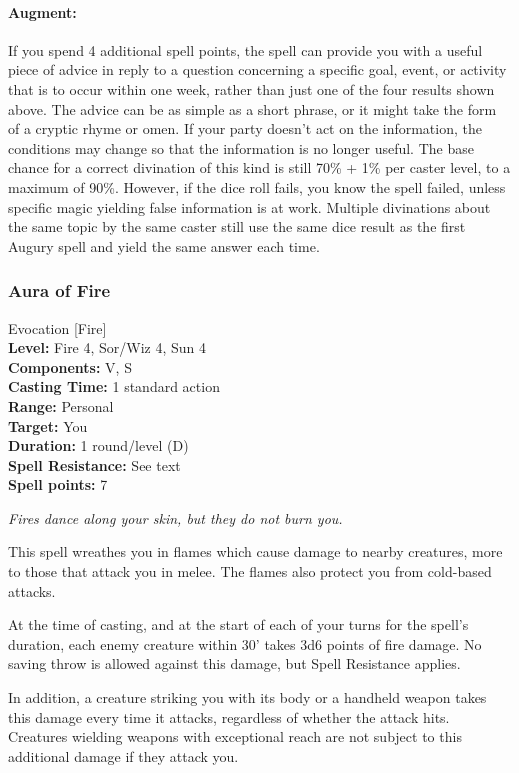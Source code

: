 \paragraph{Augment:} If you spend 4 additional spell points, the spell can provide you with a useful piece of advice in reply to a question concerning a specific goal, event, or activity that is to occur within one week, rather than just one of the four results shown above. 
The advice can be as simple as a short phrase, or it might take the form of a cryptic rhyme or omen. 
If your party doesn't act on the information, the conditions may change so that the information is no longer useful. 
The base chance for a correct divination of this kind is still 70\% + 1\% per caster level, to a maximum of 90\%. 
However, if the dice roll fails, you know the spell failed, unless specific magic yielding false information is at work.
Multiple divinations about the same topic by the same caster still use the same dice result as the first Augury spell and yield the same answer each time.
\subsubsection{Aura of Fire}
\label{Spell:AuraOfFire}
Evocation [Fire]
\\ \textbf{Level:} Fire 4, Sor/Wiz 4, Sun 4
\\ \textbf{Components:} V, S
\\ \textbf{Casting Time:} 1 standard action
\\ \textbf{Range:} Personal
\\ \textbf{Target:} You
\\ \textbf{Duration:} 1 round/level (D)
\\ \textbf{Spell Resistance:} See text
\\ \textbf{Spell points:} 7

\emph{Fires dance along your skin, but they do not burn you.}

This spell wreathes you in flames which cause damage to nearby creatures, more to those that attack you in melee.
The flames also protect you from cold-based attacks.

At the time of casting, and at the start of each of your turns for the spell's duration, each enemy creature within
30' takes 3d6 points of fire damage.
No saving throw is allowed against this damage, but Spell Resistance applies.

In addition, a creature striking you with its body or a handheld weapon takes this damage every time it attacks,
regardless of whether the attack hits.
Creatures wielding weapons with exceptional reach are not subject to this additional damage if they attack you.

